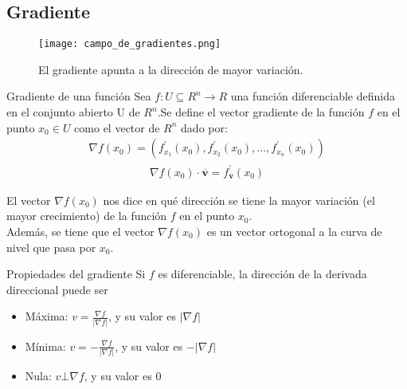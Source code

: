 \documentclass[a4paper, twoside]{article}
\numberwithin{equation}{section}
\numberwithin{figure}{section}
\numberwithin{table}{section}
\newcommand{\vect}[1]{\overline{\textbf{#1}}}
\begin{document}
\subsection{Gradiente}
\begin{minipage}{0.31\textwidth}
	\begin{figure}[H]
		\centering
		\texttt{[image: campo\_de\_gradientes.png]}
		\caption{El gradiente apunta a la dirección de mayor variación.}
	\end{figure}
\end{minipage}
\begin{minipage}{0.6\textwidth}
	\begin{definicion*}{Gradiente de una función}
		Sea $f:U\subseteq R^n \rightarrow R$ una función diferenciable definida en el conjunto abierto U de $R^n$.Se define el vector gradiente de la función $f$ en el punto $x_0\in U$ como el vector de $R^n$ dado por: \\
		\begin{align}
			\nabla f(x_0)=(f^\prime_{x_1}(x_0),f^\prime_{x_2}(x_0),\ldots,f^\prime_{x_n}(x_0))
		\end{align}
		\begin{align}
			\nabla f(x_0)\cdot\vect{v}=f^\prime_{\vect{v}}(x_0)
		\end{align}
		
		El vector $\nabla f(x_0)$ nos dice en qué dirección se tiene la mayor variación (el mayor crecimiento) de la función $f$ en el punto $x_0$.\\
		
		Además, se tiene que el vector $\nabla f(x_0)$ es un vector ortogonal a la curva de nivel que pasa por $x_0$.
	\end{definicion*}
\end{minipage}

\begin{corolario*}{Propiedades del gradiente}
	Si $f$ es diferenciable, la dirección de la derivada direccional puede ser
	\begin{itemize}
		\item Máxima: $v=\frac{\nabla f}{\left|\nabla f\right|}$, y su valor es $\left|\nabla f\right|$
		\item Mínima: $v=-\frac{\nabla f}{\left|\nabla f\right|}$, y su valor es $-\left|\nabla f\right|$
		\item Nula: $v\bot\nabla f$, y su valor es 0
	\end{itemize}
\end{corolario*}
\end{document}
